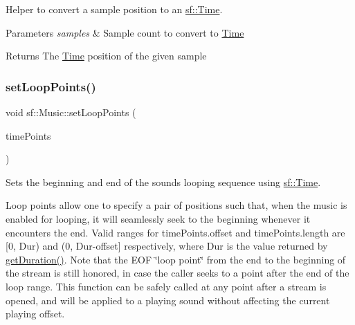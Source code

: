Helper to convert a sample position to an \mbox{\hyperlink{classsf_1_1_time}{sf\+::\+Time}}. 


\begin{DoxyParams}{Parameters}
{\em samples} & Sample count to convert to \mbox{\hyperlink{classsf_1_1_time}{Time}}\\
\hline
\end{DoxyParams}
\begin{DoxyReturn}{Returns}
The \mbox{\hyperlink{classsf_1_1_time}{Time}} position of the given sample \begin{DoxyVerb}\end{DoxyVerb}
 
\end{DoxyReturn}
\mbox{\label{classsf_1_1_music_ae7b339f0a957dfad045f3f28083a015e}} 
\subsubsection{\texorpdfstring{setLoopPoints()}{setLoopPoints()}}
{\footnotesize\ttfamily void sf\+::\+Music\+::set\+Loop\+Points (\begin{DoxyParamCaption}\item[{\mbox{\hyperlink{structsf_1_1_music_1_1_span}{Time\+Span}}}]{time\+Points }\end{DoxyParamCaption})}



Sets the beginning and end of the sound\textquotesingle{}s looping sequence using \mbox{\hyperlink{classsf_1_1_time}{sf\+::\+Time}}. 

Loop points allow one to specify a pair of positions such that, when the music is enabled for looping, it will seamlessly seek to the beginning whenever it encounters the end. Valid ranges for time\+Points.\+offset and time\+Points.\+length are \mbox{[}0, Dur) and (0, Dur-\/offset\mbox{]} respectively, where Dur is the value returned by \mbox{\hyperlink{classsf_1_1_music_a288ef6f552a136b0e56952dcada3d672}{get\+Duration()}}. Note that the E\+OF \char`\"{}loop point\char`\"{} from the end to the beginning of the stream is still honored, in case the caller seeks to a point after the end of the loop range. This function can be safely called at any point after a stream is opened, and will be applied to a playing sound without affecting the current playing offset.

